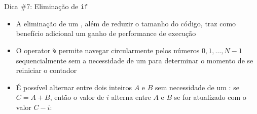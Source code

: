 \begin{frame}[fragile]{Dica \#7: Eliminação de \texttt{if}}

    \begin{itemize}
        \item A eliminação de um , além de reduzir o tamanho do código,
            traz como benefício adicional um ganho de performance de execução

        \item O operator \texttt{\%} permite navegar circularmente pelos números
            $0, 1, \ldots, N - 1$ sequencialmente sem a 
            necessidade de um  para determinar o momento de se reiniciar o 
            contador

        \item É possível alternar entre dois inteiros $A$ e $B$ sem necessidade de um 
            : se $C = A + B$, então o valor de $i$ alterna entre $A$ e $B$ 
            se for atualizado com o valor $C - i$:
    \end{itemize}

\end{frame}
